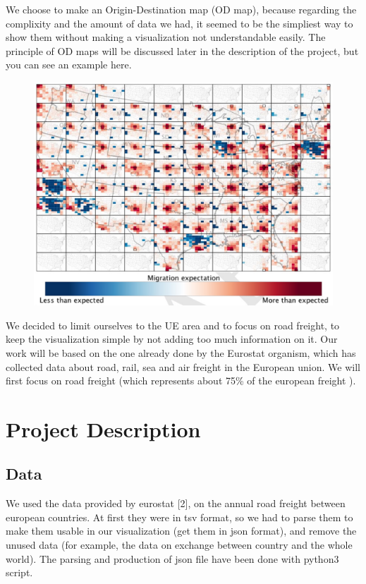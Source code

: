 \documentclass{vgtc}
\begin{document}
We choose to make an Origin-Destination map (OD map), because regarding the complixity and the amount of data we had, it seemed to be the simpliest way to show them without making a visualization not understandable easily. The principle of OD maps will be discussed later in the description of the project, but you can see an example here. 
\begin{figure}[H]
\center
\includegraphics[scale=0.4]{odMap.jpg}
\end{figure}



We decided to limit ourselves to the UE area and to focus on road freight, to keep the visualization simple by not adding too much information on it. Our work will be based on the one already done by the Eurostat organism, which has collected data about road, rail, sea and air freight in the European union. We will first focus on road freight (which represents about 75\% of the european freight \cite{dataset}).

\section{Project Description}

\subsection{Data}
We used the data provided by eurostat [2], on the annual road freight between european countries. At first they were in tsv format, so we had to parse them to make them usable in our visualization (get them in json format), and remove the unused data (for example, the data on exchange between country and the whole world). The parsing and production of json file have been done with python3 script. 
\end{document}
